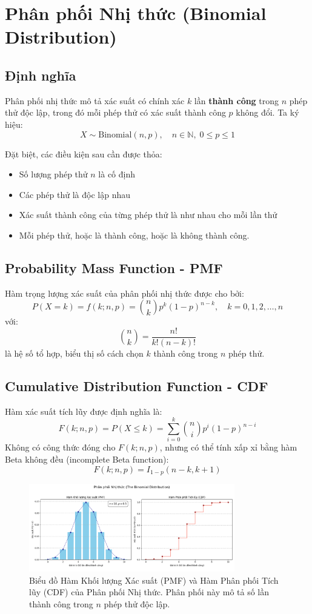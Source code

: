 \section{Phân phối Nhị thức (Binomial Distribution)}

\subsection{Định nghĩa}

Phân phối nhị thức mô tả xác suất có chính xác $k$ lần \textbf{thành công} trong $n$ phép thử độc lập, 
trong đó mỗi phép thử có xác suất thành công $p$ không đổi.  
Ta ký hiệu:
\[
X \sim \mathrm{Binomial}(n, p), \quad n \in \mathbb{N}, \; 0 \leq p \leq 1
\]


Đặt biệt, các điều kiện sau cần được thỏa:

\begin{itemize}
    \item Số lượng phép thử $n$ là cố định 
    \item Các phép thử là độc lập nhau
    \item Xác suất thành công của từng phép thử là như nhau cho mỗi lần thử
    \item Mỗi phép thử, hoặc là thành công, hoặc là không thành công.
\end{itemize}
\subsection{Probability Mass Function - PMF}

Hàm trọng lượng xác suất của phân phối nhị thức được cho bởi:
\[
P(X = k) = f(k; n, p) = \binom{n}{k} p^k (1 - p)^{n - k}, \quad k = 0, 1, 2, \dots, n
\]
với:
\[
\binom{n}{k} = \frac{n!}{k!(n - k)!}
\]
là hệ số tổ hợp, biểu thị số cách chọn $k$ thành công trong $n$ phép thử.

\subsection{Cumulative Distribution Function - CDF}

Hàm xác suất tích lũy được định nghĩa là:
\[
F(k; n, p) = P(X \leq k) = \sum_{i = 0}^{k} \binom{n}{i} p^i (1 - p)^{n - i}
\]
Không có công thức đóng cho $F(k; n, p)$, nhưng có thể tính xấp xỉ bằng hàm Beta không đều (incomplete Beta function):
\[
F(k; n, p) = I_{1-p}(n - k, k + 1)
\]
  
\begin{figure}[h!]
    \centering
    \includegraphics[width=0.8\textwidth]{images/Binomial_PMF_and_CDF.png}
    \caption{Biểu đồ Hàm Khối lượng Xác suất (PMF) và Hàm Phân phối Tích lũy (CDF) của Phân phối Nhị thức. Phân phối này mô tả số lần thành công trong $n$ phép thử độc lập.}
    \label{fig:binomial_dist}
\end{figure}

